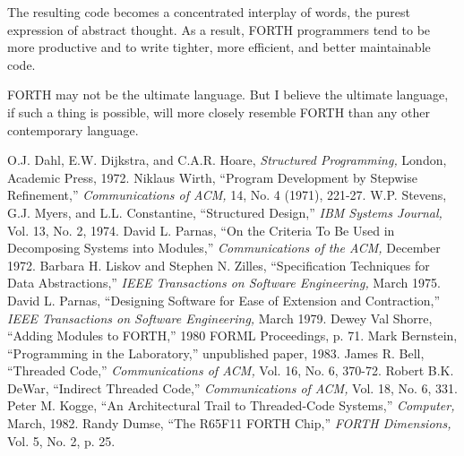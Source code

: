 The resulting code becomes a concentrated interplay of words, the
purest expression of abstract thought. As a result, FORTH programmers
tend to be more productive and to write tighter, more efficient, and
better maintainable code.

FORTH may not be the ultimate language. But I believe the ultimate
language, if such a thing is possible, will more closely resemble
FORTH than any other contemporary language.


\begin{references}{99}
 O.J. Dahl, E.W. Dijkstra, and C.A.R. Hoare,
\emph{Structured Programming,} London, Academic Press, 1972.
 Niklaus Wirth, ``Program Development by Stepwise
Refinement,'' \emph{Communications of ACM,} 14, No. 4 (1971), 221-27.
 W.P. Stevens, G.J. Myers, and L.L. Constantine,
``Structured Design,'' \emph{IBM Systems Journal,} Vol. 13, No. 2, 1974.
 David L. Parnas, ``On the Criteria To Be Used in
Decomposing Systems into Modules,'' \emph{Communications of the ACM,}
December 1972.
 Barbara H. Liskov and Stephen N. Zilles,
``Specification Techniques for Data Abstractions,'' \emph{IEEE
Transactions on Software Engineering,} March 1975.
 David L. Parnas, ``Designing Software for Ease of
Extension and Contraction,'' \emph{IEEE Transactions on Software
Engineering,} March 1979.
 Dewey Val Shorre, ``Adding Modules to FORTH,''
1980 FORML Proceedings, p. 71.
 Mark Bernstein, ``Programming in the Laboratory,''
  unpublished paper, 1983.
 James R. Bell, ``Threaded Code,'' \emph{Communications
of ACM,} Vol. 16, No. 6, 370-72.
 Robert B.K. DeWar, ``Indirect Threaded Code,''
\emph{Communications of ACM,} Vol. 18, No. 6, 331.
 Peter M. Kogge, ``An Architectural Trail to
Threaded-Code Systems,'' \emph{Computer,} March, 1982.
 Randy Dumse, ``The R65F11 FORTH Chip,'' \emph{FORTH
Dimensions,} Vol. 5, No. 2, p. 25.
\end{references}
